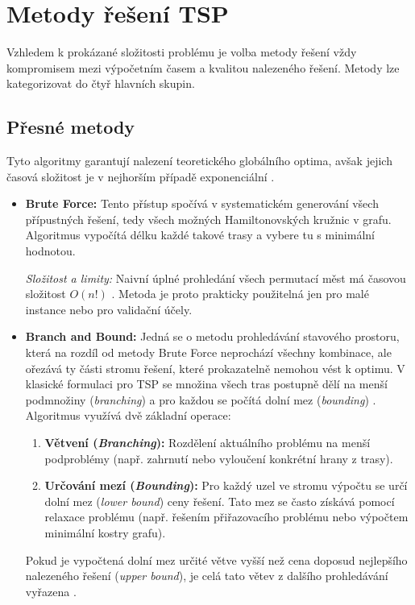\section{Metody řešení TSP}
Vzhledem k prokázané složitosti problému je volba metody řešení vždy kompromisem mezi výpočetním časem a kvalitou nalezeného řešení. Metody lze kategorizovat do čtyř hlavních skupin.

\subsection{Přesné metody}
Tyto algoritmy garantují nalezení teoretického globálního optima, avšak jejich časová složitost je v nejhorším případě exponenciální \cite{johnson1997tsp_local_search}.
\begin{itemize}
\item \textbf{Brute Force:} 
    Tento přístup spočívá v systematickém generování všech přípustných řešení, tedy všech možných Hamiltonovských kružnic v grafu. Algoritmus vypočítá délku každé takové trasy a vybere tu s minimální hodnotou.
    
    \textit{Složitost a limity:} Naivní úplné prohledání všech permutací měst má časovou složitost $O(n!)$ \cite{cmu_15451_dp2_2023}. Metoda je proto prakticky použitelná jen pro malé instance nebo pro validační účely.

    \item \textbf{Branch and Bound:} 
    Jedná se o metodu prohledávání stavového prostoru, která na rozdíl od metody Brute Force neprochází všechny kombinace, ale ořezává ty části stromu řešení, které prokazatelně nemohou vést k optimu. V klasické formulaci pro TSP se množina všech tras postupně dělí na menší podmnožiny (\textit{branching}) a pro každou se počítá dolní mez (\textit{bounding}) \cite{little1963bnb}. Algoritmus využívá dvě základní operace:
    \begin{enumerate}
        \item \textbf{Větvení (\textit{Branching}):} Rozdělení aktuálního problému na menší podproblémy (např. zahrnutí nebo vyloučení konkrétní hrany z trasy).
        \item \textbf{Určování mezí (\textit{Bounding}):} Pro každý uzel ve stromu výpočtu se určí dolní mez (\textit{lower bound}) ceny řešení. Tato mez se často získává pomocí relaxace problému (např. řešením přiřazovacího problému nebo výpočtem minimální kostry grafu).
    \end{enumerate}
    
    Pokud je vypočtená dolní mez určité větve vyšší než cena doposud nejlepšího nalezeného řešení (\textit{upper bound}), je celá tato větev z dalšího prohledávání vyřazena \cite{little1963bnb}. 
    

\end{itemize}
